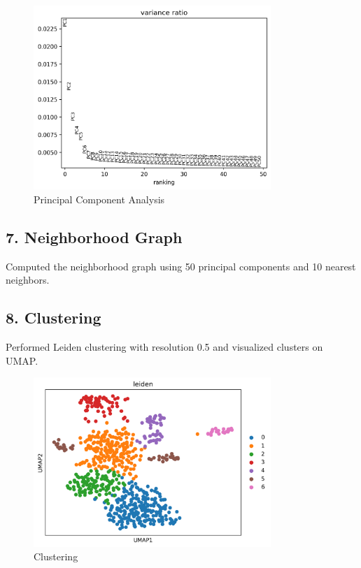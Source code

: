 \documentclass[12pt]{article}
\begin{document}
\begin{figure}[H]
    \centering
    \includegraphics[width=0.8\textwidth]{pca_variance.png}
    \caption{Principal Component Analysis}
    \label{fig:pca_variance}
\end{figure}

\subsection{7. Neighborhood Graph}
Computed the neighborhood graph using 50 principal components and 10 nearest neighbors.

\subsection{8. Clustering}
Performed Leiden clustering with resolution 0.5 and visualized clusters on UMAP.

\begin{figure}[H]
    \centering
    \includegraphics[width=0.8\textwidth]{umap_clusters.png}
    \caption{Clustering}
    \label{fig:umap_clusters}
\end{figure}
\end{document}
